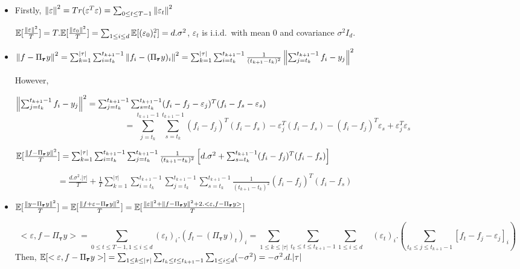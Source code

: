 \documentclass[11pt]{article}
\begin{document}
\begin{solution}  %


\begin{itemize}
    \item Firstly, $\left\lVert\varepsilon\right\rVert^2 = Tr(\varepsilon^T\varepsilon) = \sum_{0 \leq t \leq T-1}\left\lVert \varepsilon_t\right\rVert^2$

$\mathbb{E}[\frac{\left\lVert\varepsilon\right\rVert^2}{T}] = T.\mathbb{E}[\frac{\left\lVert\varepsilon_0\right\rVert^2}{T}] =  \sum_{1 \leq i \leq d} \mathbb{E}[(\varepsilon_0)_i^2] = d.\sigma^2$,  $\varepsilon_t$ is i.i.d.\ with mean 0 and covariance $\sigma^2 I_d$.
 
    \item $\left\lVert f - \Pi_{\pmb{\tau}}y\right\rVert^2 = \sum_{k = 1}^ {\vert \tau \vert} \sum_{i = t_k}^{t_{k+1}-1} \left\lVert f_i - (\Pi_{\pmb{\tau}}y)_i\right\rVert^2 =  \sum_{k = 1}^ {\vert \tau \vert} \sum_{i = t_k}^{t_{k+1}-1} \frac{1}{(t_{k+1}-t_k)^2} \left\lVert \sum_{j = t_k}^{t_{k+1}-1}f_i - y_j\right\rVert^2$
    
However, 

$\left\lVert \sum_{j = t_k}^{t_{k+1}-1}f_i - y_j\right\rVert^2 = \sum_{j = t_k}^{t_{k+1}-1} \sum_{s = t_k}^{t_{k+1}-1}(f_i - f_j - \varepsilon_j)^T (f_i - f_s - \varepsilon_s) $
$$ =  \sum_{j = t_k}^{t_{k+1}-1} \sum_{s = t_k}^{t_{k+1}-1}(f_i - f_j)^T (f_i - f_s)  - \varepsilon_j^T (f_i - f_s)  - (f_i - f_j)^T \varepsilon_s + \varepsilon_j^T\varepsilon_s$$

$\mathbb{E}[\frac{\left\lVert f - \Pi_{\pmb{\tau}}y\right\rVert^2}{T}] =\sum_{k = 1}^ {\vert \tau \vert} \sum_{i = t_k}^{t_{k+1}-1}   \sum_{j = t_k}^{t_{k+1}-1} \frac{1}{(t_{k+1}-t_k)^2} \left[d.\sigma^2 + \sum_{s = t_k}^{t_{k+1}-1}(f_i - f_j)^T (f_i - f_s)  \right]$

$ \qquad  \qquad  \quad  = \frac{d.\sigma^2.\vert \tau \vert }{T}+  \frac{1}{T}\sum_{k = 1}^ {\vert \tau \vert} \sum_{i = t_k}^{t_{k+1}-1}   \sum_{j = t_k}^{t_{k+1}-1} \sum_{s = t_k}^{t_{k+1}-1} \frac{1}{(t_{k+1}-t_k)^2} (f_i - f_j)^T (f_i - f_s) $


    \item $\mathbb{E}[\frac{\left\lVert y - \Pi_{\pmb{\tau}}y\right\rVert^2}{T}] = \mathbb{E}[\frac{\left\lVert f +  \varepsilon- \Pi_{\pmb{\tau}}y\right\rVert^2}{T}]  = \mathbb{E}[\frac{\left\lVert \varepsilon\right\rVert^2 + \left\lVert f - \Pi_{\pmb{\tau}}y\right\rVert^2 + 2.<\varepsilon,f - \Pi_{\pmb{\tau}}y>}{T}] $
    
$$ <\varepsilon,f - \Pi_{\pmb{\tau}}y> = \sum_{0 \leq t \leq T-1, 1 \leq i \leq d} (\varepsilon_t)_i . (f_t - (\Pi_{\pmb{\tau}}y)_t)_i =  \sum_{1 \leq k \leq \vert \tau \vert}   \sum_{t_k \leq t \leq t_{k+1}-1}  \sum_{1 \leq i \leq d} \quad (\varepsilon_t)_i . (\sum_{t_k \leq j \leq t_{k+1}-1} \left[ f_t - f_j- \varepsilon_j \right]_i)$$ 
Then, 
$\mathbb{E}[<\varepsilon,f - \Pi_{\pmb{\tau}}y>]  =  \sum_{1 \leq k \leq \vert \tau \vert}   \sum_{t_k \leq t \leq t_{k+1}-1}  \sum_{1 \leq i \leq d} ( - \sigma^2 ) = - \sigma^2.d.\vert \tau \vert$


\end{itemize}
\end{solution}
\end{document}
